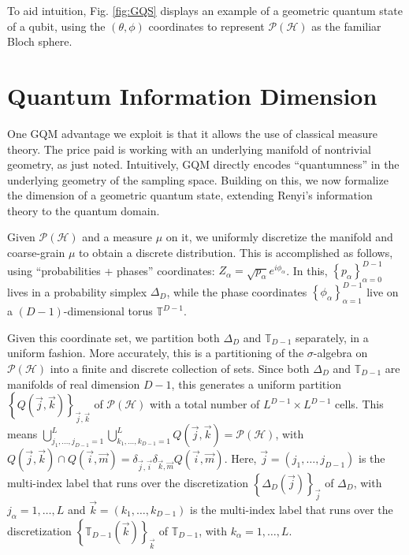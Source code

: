 \documentclass[draft,nofootinbib,pre,twocolumn,showkeys,superscriptaddress,preprintnumbers,floatfix]{revtex4-1}
\newcommand{\1}{\mathbbm{1}}
\newcommand{\PH}{\mathcal{P}(\mathcal{H})}
\begin{document}
To aid intuition, Fig. \ref{fig:GQS} displays an example of a geometric quantum
state of a qubit, using the $(\theta,\phi)$ coordinates to represent $\PH$ as
the familiar Bloch sphere.

\section{Quantum Information Dimension}
\label{sec:QID}

One GQM advantage we exploit is that it allows the use of classical measure
theory. The price paid is working with an underlying manifold of nontrivial geometry, 
as just noted. Intuitively, GQM directly encodes ``quantumness'' in the underlying 
geometry of the sampling space. Building on this, we now formalize the dimension 
of a geometric quantum state, extending Renyi's information theory \cite{Renyi59} to 
the quantum domain.

Given $\PH$ and a measure $\mu$ on it, we uniformly discretize the manifold
and coarse-grain $\mu$ to obtain a discrete distribution. This is accomplished 
as follows, using ``probabilities + phases'' coordinates: 
$Z_\alpha = \sqrt{p_\alpha}e^{i\phi_\alpha}$. In this,
$\left\{p_\alpha\right\}_{\alpha=0}^{D-1}$
lives in a  probability simplex $\Delta_{D}$, while the phase coordinates 
$\left\{\phi_\alpha\right\}_{\alpha=1}^{D-1}$ live on a $(D-1)$-dimensional 
torus $\mathbb{T}^{D-1}$.

Given this coordinate set, we partition both $\Delta_D$ and
$\mathbb{T}_{D-1}$ separately, in a uniform fashion. More accurately,
this is a partitioning of the $\sigma$-algebra on $\PH$ into a finite and
discrete collection of sets. Since both $\Delta_D$ and $\mathbb{T}_{D-1}$ are
manifolds of real dimension $D-1$, this generates a uniform partition $\left\{
Q(\vec{j},\vec{k})\right\}_{\vec{j},\vec{k}}$ of $\PH$ with a total number of
$L^{D-1} \times L^{D-1}$ cells. This means $\bigcup_{j_1,\ldots,j_{D-1}=1}^{L}
\bigcup_{k_1,\ldots,k_{D-1}=1}^{L} Q(\vec{j},\vec{k}) = \PH$, with
$Q(\vec{j},\vec{k}) \cap Q(\vec{i},\vec{m}) =
\delta_{\vec{j},\vec{i}}\delta_{\vec{k},\vec{m}}Q(\vec{i},\vec{m})$. Here,
$\vec{j} = (j_1,\ldots,j_{D-1})$ is the multi-index label that runs over the
discretization $\left\{ \Delta_D(\vec{j})\right\}_{\vec{j}}$ of $\Delta_D$,
with $j_\alpha = 1,\ldots, L$ and $\vec{k} = (k_1,\ldots, k_{D-1})$ is the
multi-index label that runs over the discretization $\left\{
\mathbb{T}_{D-1}(\vec{k})\right\}_{\vec{k}}$ of $\mathbb{T}_{D-1}$, with
$k_\alpha = 1,\ldots,L$.
\end{document}
